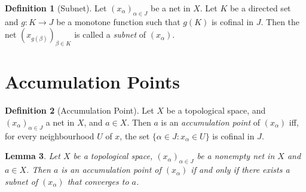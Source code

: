 \documentclass{report}
\newtheorem{lm}{Lemma}[section]
\theoremstyle{definition}
\newtheorem{df}[lm]{Definition}
\begin{document}
    \begin{df}[Subnet]
    Let $(x_\alpha)_{\alpha \in J}$ be a net in $X$. Let $K$ be a directed set
and $g : K \rightarrow J$ be a monotone function such that $g(K)$ is cofinal in
$J$. Then the net $(x_{g(\beta)})_{\beta \in K}$ is called a \emph{subnet} of
$(x_\alpha)$.
  \end{df}

  \section{Accumulation Points}

    \begin{df}[Accumulation Point]
    Let $X$ be a topological space, and $(x_\alpha)_{\alpha \in J}$ a net in $X$,
and $a \in X$.    Then $a$ is an \emph{accumulation point} of $(x_\alpha)$ iff,
for every    neighbourhood $U$ of $x$, the set $\{ \alpha \in J : x_\alpha \in
U \}$ is cofinal in $J$.
  \end{df}

    \begin{lm}
      \label{lm:topology:accumulation_point:subnet}
    Let $X$ be a topological space, $(x_\alpha)_{\alpha \in J}$ be a
nonempty net in $X$
and $a \in X$. Then $a$ is an accumulation point of $(x_\alpha)$ if and only if
there exists a subnet of $(x_\alpha)$ that converges to $a$.
  \end{lm}
\end{document}
